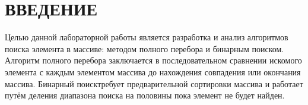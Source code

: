 \chapter*{ВВЕДЕНИЕ}

Целью данной лабораторной работы является разработка и анализ алгоритмов поиска элемента в массиве: методом полного перебора и бинарным поиском. Алгоритм полного перебора заключается в последовательном сравнении искомого элемента с каждым элементом массива до нахождения совпадения или окончания массива. Бинарный поисктребует предварительной сортировки массива и работает путём деления диапазона поиска на половины пока элемент не будет найден.

